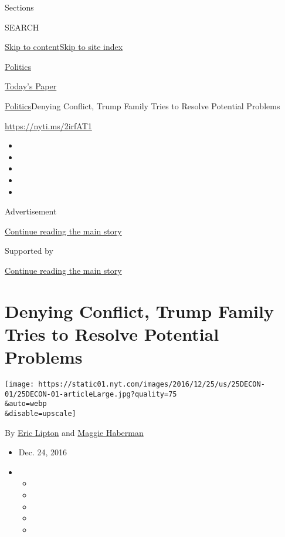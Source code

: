 Sections

SEARCH

\protect\hyperlink{site-content}{Skip to
content}\protect\hyperlink{site-index}{Skip to site index}

\href{https://www.nytimes.com/section/politics}{Politics}

\href{https://myaccount.nytimes.com/auth/login?response_type=cookie\&client_id=vi}{}

\href{https://www.nytimes.com/section/todayspaper}{Today's Paper}

\href{/section/politics}{Politics}\textbar{}Denying Conflict, Trump
Family Tries to Resolve Potential Problems

\url{https://nyti.ms/2irfAT1}

\begin{itemize}
\item
\item
\item
\item
\item
\end{itemize}

Advertisement

\protect\hyperlink{after-top}{Continue reading the main story}

Supported by

\protect\hyperlink{after-sponsor}{Continue reading the main story}

\hypertarget{denying-conflict-trump-family-tries-to-resolve-potential-problems}{%
\section{Denying Conflict, Trump Family Tries to Resolve Potential
Problems}\label{denying-conflict-trump-family-tries-to-resolve-potential-problems}}

\texttt{[image: https://static01.nyt.com/images/2016/12/25/us/25DECON-01/25DECON-01-articleLarge.jpg?quality=75\\\&auto=webp\\\&disable=upscale]}

By \href{http://www.nytimes.com/by/eric-lipton}{Eric Lipton} and
\href{http://www.nytimes.com/by/maggie-haberman}{Maggie Haberman}

\begin{itemize}
\item
  Dec. 24, 2016
\item
  \begin{itemize}
  \item
  \item
  \item
  \item
  \item
  \end{itemize}
\end{itemize}

